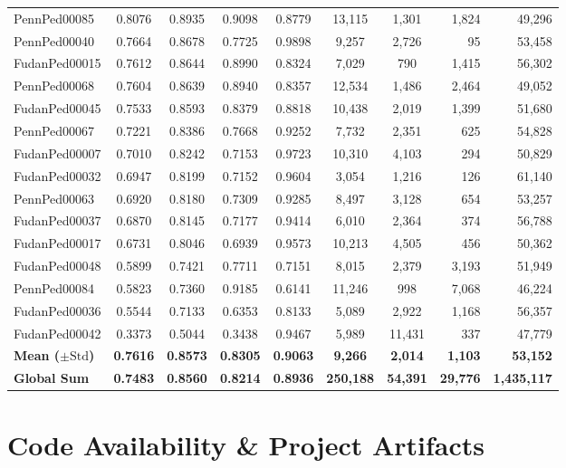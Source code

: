 \documentclass[10pt,a4paper]{report}
\begin{document}
\begin{table}[htbp]
\begin{tabular}{lccccccrr}
PennPed00085 & 0.8076 & 0.8935 & 0.9098 & 0.8779 & 13,115 & 1,301 & 1,824 & 49,296 \\
PennPed00040 & 0.7664 & 0.8678 & 0.7725 & 0.9898 & 9,257 & 2,726 & 95 & 53,458 \\
FudanPed00015 & 0.7612 & 0.8644 & 0.8990 & 0.8324 & 7,029 & 790 & 1,415 & 56,302 \\
PennPed00068 & 0.7604 & 0.8639 & 0.8940 & 0.8357 & 12,534 & 1,486 & 2,464 & 49,052 \\
FudanPed00045 & 0.7533 & 0.8593 & 0.8379 & 0.8818 & 10,438 & 2,019 & 1,399 & 51,680 \\
PennPed00067 & 0.7221 & 0.8386 & 0.7668 & 0.9252 & 7,732 & 2,351 & 625 & 54,828 \\
FudanPed00007 & 0.7010 & 0.8242 & 0.7153 & 0.9723 & 10,310 & 4,103 & 294 & 50,829 \\
FudanPed00032 & 0.6947 & 0.8199 & 0.7152 & 0.9604 & 3,054 & 1,216 & 126 & 61,140 \\
PennPed00063 & 0.6920 & 0.8180 & 0.7309 & 0.9285 & 8,497 & 3,128 & 654 & 53,257 \\
FudanPed00037 & 0.6870 & 0.8145 & 0.7177 & 0.9414 & 6,010 & 2,364 & 374 & 56,788 \\
FudanPed00017 & 0.6731 & 0.8046 & 0.6939 & 0.9573 & 10,213 & 4,505 & 456 & 50,362 \\
FudanPed00048 & 0.5899 & 0.7421 & 0.7711 & 0.7151 & 8,015 & 2,379 & 3,193 & 51,949 \\
PennPed00084 & 0.5823 & 0.7360 & 0.9185 & 0.6141 & 11,246 & 998 & 7,068 & 46,224 \\
FudanPed00036 & 0.5544 & 0.7133 & 0.6353 & 0.8133 & 5,089 & 2,922 & 1,168 & 56,357 \\
FudanPed00042 & 0.3373 & 0.5044 & 0.3438 & 0.9467 & 5,989 & 11,431 & 337 & 47,779 \\
\midrule
\textbf{Mean ($\pm\text{Std}$)} & \textbf{0.7616} & \textbf{0.8573} & \textbf{0.8305} & \textbf{0.9063} & \textbf{9,266} & \textbf{2,014} & \textbf{1,103} & \textbf{53,152} \\
\textbf{Global Sum} & \textbf{0.7483} & \textbf{0.8560} & \textbf{0.8214} & \textbf{0.8936} & \textbf{250,188} & \textbf{54,391} & \textbf{29,776} & \textbf{1,435,117} \\
\bottomrule
\end{tabular}
\end{table}

\section*{Code Availability \& Project Artifacts}
\end{document}
